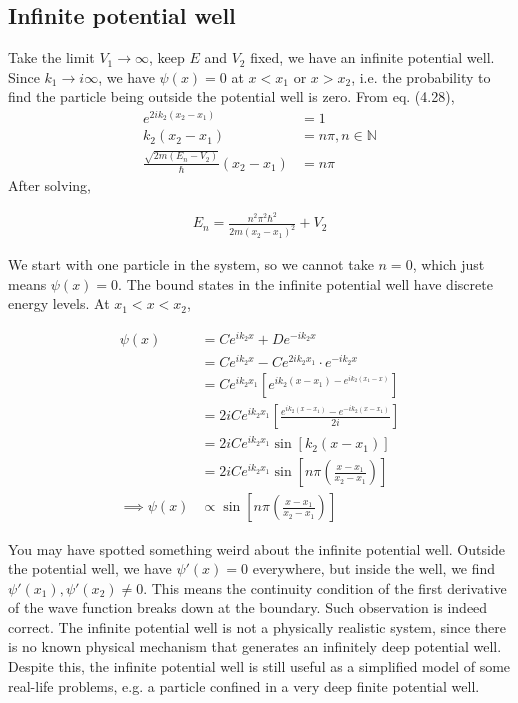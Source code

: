 \documentclass[12pt]{book} %
\numberwithin{equation}{chapter}
\def\N{\mathbb{N}}
\begin{document}
\subsection*{Infinite potential well}
Take the limit $V_{1}\to\infty$, keep $E$ and $V_{2}$ fixed, we have an infinite potential well. Since $k_{1}\to i\infty$, we have $\psi(x)=0$ at $x<x_{1}$ or $x>x_{2}$, i.e. the probability to find the particle being outside the potential well is zero.\bigskip\newline
From eq. (4.28),
\begin{align*}
e^{2ik_{2}(x_{2}-x_{1})}&=1\\
k_{2}(x_{2}-x_{1})&=n\pi, n\in\N\\
\frac{\sqrt{2m(E_{n}-V_{2})}}{\hbar}(x_{2}-x_{1})&=n\pi
\end{align*}
After solving,
\begin{eqnbox}
\begin{align}
E_{n}=\frac{n^{2}\pi^{2}\hbar^{2}}{2m{(x_{2}-x_{1})}^{2}}+V_{2}
\end{align}
\end{eqnbox}
We start with one particle in the system, so we cannot take $n=0$, which just means $\psi(x)=0$. The bound states in the infinite potential well have discrete energy levels.\bigskip\newline
At $x_{1}<x<x_{2}$,
\begin{eqnbox}
\begin{align}
\psi(x)&=Ce^{ik_{2}x}+De^{-ik_{2}x}\nonumber\\
&=Ce^{ik_{2}x}-Ce^{2ik_{2}x_{1}}\cdot e^{-ik_{2}x}\nonumber\\
&=Ce^{ik_{2}x_{1}}\left[e^{ik_{2}(x-x_{1})-e^{ik_{2}(x_{1}-x)}}\right]\nonumber\\
&=2iCe^{ik_{2}x_{1}}\left[\frac{e^{ik_{2}(x-x_{1})}-e^{-ik_{2}(x-x_{1})}}{2i}\right]\nonumber\\
&=2iCe^{ik_{2}x_{1}}\sin\left[k_{2}(x-x_{1})\right]\nonumber\\
&=2iCe^{ik_{2}x_{1}}\sin\left[n\pi\left(\frac{x-x_{1}}{x_{2}-x_{1}}\right)\right]\nonumber\\
\implies \psi(x)&\propto \sin\left[n\pi\left(\frac{x-x_{1}}{x_{2}-x_{1}}\right)\right]
\end{align}
\end{eqnbox}
You may have spotted something weird about the infinite potential well. Outside the potential well, we have $\psi'(x)=0$ everywhere, but inside the well, we find $\psi'(x_{1}), \psi'(x_{2})\neq0$. This means the continuity condition of the first derivative of the wave function breaks down at the boundary.\bigskip\newline
Such observation is indeed correct. The infinite potential well is not a physically realistic system, since there is no known physical mechanism that generates an infinitely deep potential well. Despite this, the infinite potential well is still useful as a simplified model of some real-life problems, e.g. a particle confined in a very deep finite potential well.
\end{document}
